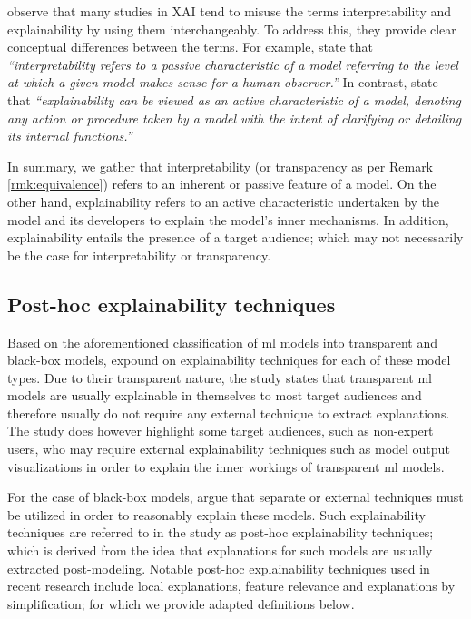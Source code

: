 \label{section:xai_terminology}

\citet{arrieta2020explainable} observe that many studies in XAI tend to misuse the
terms interpretability and explainability by using them interchangeably. To
address this, they provide clear conceptual differences between the terms. For
example, \citet[Page 3, Section 2.1]{arrieta2020explainable} state that
\textit{``interpretability refers to a passive characteristic of a model
  referring to the level at which a given model makes sense for a human
  observer.''} In contrast, \citet[Page 3, Section 2.1]{arrieta2020explainable}
state that \textit{``explainability can be viewed as an active characteristic of
  a model, denoting any action or procedure taken by a model with the intent of
  clarifying or detailing its internal functions.''}

In summary, we gather that interpretability (or transparency as per Remark
\ref{rmk:equivalence}) refers to an inherent or passive feature of a model. On
the other hand, explainability refers to an active characteristic undertaken by
the model and its developers to explain the model's inner mechanisms. In
addition, explainability entails the presence of a target audience; which may
not necessarily be the case for interpretability or transparency.

\subsection{Post-hoc explainability techniques}

\label{section:xai_techniques}

Based on the aforementioned classification of \ac{ml} models into transparent and
black-box models, \citet{arrieta2020explainable} expound on explainability
techniques for each of these model types. Due to their transparent nature, the
study states that transparent \ac{ml} models are usually explainable in themselves to
most target audiences and therefore usually do not require any external
technique to extract explanations. The study does however highlight some target
audiences, such as non-expert users, who may require external explainability
techniques such as model output visualizations in order to explain the inner
workings of transparent \ac{ml} models.

For the case of black-box models, \citet{arrieta2020explainable} argue that
separate or external techniques must be utilized in order to reasonably explain
these models. Such explainability techniques are referred to in the study as
post-hoc explainability techniques; which is derived from the idea that
explanations for such models are usually extracted post-modeling. Notable
post-hoc explainability techniques used in recent research include local
explanations, feature relevance and explanations by simplification; for which we
provide adapted definitions below.

